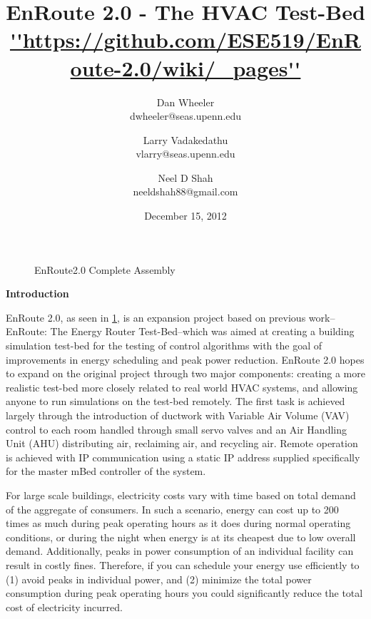 \documentclass[a4paper,10pt,twocolumn]{article}
\begin{document}
\title{{\bf EnRoute 2.0 - The HVAC Test-Bed} \\ \normalsize\url{''https://github.com/ESE519/EnRoute-2.0/wiki/_pages''}}
\date{December 15, 2012}
\author{Dan Wheeler \\dwheeler@seas.upenn.edu
        \and Larry Vadakedathu \\vlarry@seas.upenn.edu
	\and Neel D Shah \\neeldshah88@gmail.com}
\maketitle

\begin{figure}[ht]
\centering
{}
\caption{EnRoute2.0 Complete Assembly}
\label{enroute2}
\end{figure}

\vspace{-5 mm}

\begin{center}
{\bf Introduction}
\end{center}

EnRoute 2.0, as seen in \ref{enroute2}, is an expansion project based on previous work--EnRoute:  The Energy Router Test-Bed--which was aimed at creating a building simulation test-bed for the testing of control algorithms with the goal of improvements in energy scheduling and peak power reduction.  EnRoute 2.0 hopes to expand on the original project through two major components:  creating a more realistic test-bed more closely related to real world HVAC systems, and allowing anyone to run simulations on the test-bed remotely.  The first task is achieved largely through the introduction of ductwork with Variable Air Volume (VAV) control to each room handled through small servo valves and an Air Handling Unit (AHU) distributing air, reclaiming air, and recycling air.  Remote operation is achieved with IP communication using a static IP address supplied specifically for the master mBed controller of the system.

For large scale buildings, electricity costs vary with time based on total demand of the aggregate of consumers.  In such a scenario, energy can cost up to 200 times as much during peak operating hours as it does during normal operating conditions, or during the night when energy is at its cheapest due to low overall demand.  Additionally, peaks in power consumption of an individual facility can result in costly fines.  Therefore, if you can schedule your energy use efficiently to (1) avoid peaks in individual power, and (2) minimize the total power consumption during peak operating hours you could significantly reduce the total cost of electricity incurred.
\end{document}
